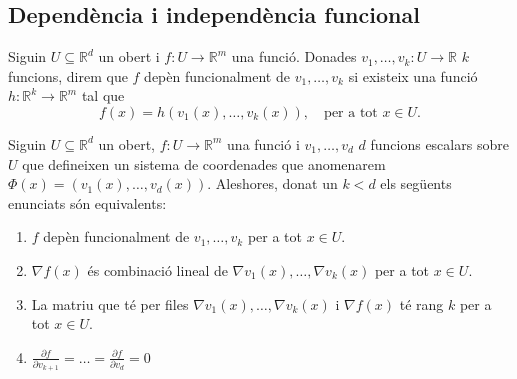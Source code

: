 \documentclass[../Apunts.tex]{subfiles}
\begin{document}
	\subsection{Dependència i independència funcional}
	\begin{definition}
		\label{def:dependència funcional}
		Siguin \(U\subseteq\mathbb{R}^{d}\) un obert i \(f\colon U\to\mathbb{R}^{m}\) una funció. Donades \(v_{1},\dots,v_{k}\colon U\to\mathbb{R}\) \(k\) funcions, direm que \(f\) depèn funcionalment de \(v_{1},\dots,v_{k}\) si existeix una funció \(h\colon\mathbb{R}^{k}\to\mathbb{R}^{m}\) tal que
		\[f(x)=h(v_{1}(x),\dots,v_{k}(x)),\quad\text{per a tot }x\in U.\]
	\end{definition}
	\begin{proposition}\label{prop:dependència funcional 4 punts}
		Siguin \(U\subseteq\mathbb{R}^{d}\) un obert, \(f\colon U\to\mathbb{R}^{m}\) una funció i \(v_{1},\dots,v_{d}\) \(d\) funcions escalars sobre \(U\) que defineixen un sistema de coordenades que anomenarem \(\Phi(x)=(v_{1}(x),\dots,v_{d}(x))\). Aleshores, donat un \(k<d\) els següents enunciats són equivalents:
		\begin{enumerate}
			\item\label{enum:dependència funcional 4 punts 1} \(f\) depèn funcionalment de \(v_{1},\dots,v_{k}\) per a tot \(x\in U\).
			\item\label{enum:dependència funcional 4 punts 2} \(\nabla f(x)\) és combinació lineal de \(\nabla v_{1}(x),\dots,\nabla v_{k}(x)\) per a tot \(x\in U\).
			\item\label{enum:dependència funcional 4 punts 3} La matriu que té per files \(\nabla v_{1}(x),\dots,\nabla v_{k}(x)\) i \(\nabla f(x)\) té rang \(k\) per a tot \(x\in U\).
			\item\label{enum:dependència funcional 4 punts 4} \(\frac{\partial f}{\partial v_{k+1}}=\dots=\frac{\partial f}{\partial v_{d}}=0\)
		\end{enumerate}

\end{proposition}
\end{document}
